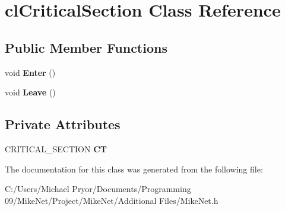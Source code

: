 \hypertarget{classcl_critical_section}{
\section{clCriticalSection Class Reference}
\label{classcl_critical_section}
}
\subsection*{Public Member Functions}
\begin{DoxyCompactItemize}
\item 
\hypertarget{classcl_critical_section_acbd3a5ab62736a9b18296fb2108b795e}{
void {\bfseries Enter} ()}
\label{classcl_critical_section_acbd3a5ab62736a9b18296fb2108b795e}

\item 
\hypertarget{classcl_critical_section_a374394a81324cc36bb8817b5feb45c6b}{
void {\bfseries Leave} ()}
\label{classcl_critical_section_a374394a81324cc36bb8817b5feb45c6b}

\end{DoxyCompactItemize}
\subsection*{Private Attributes}
\begin{DoxyCompactItemize}
\item 
\hypertarget{classcl_critical_section_a4d3de64b3b0ddc87a494fe8b4e60b196}{
CRITICAL\_\-SECTION {\bfseries CT}}
\label{classcl_critical_section_a4d3de64b3b0ddc87a494fe8b4e60b196}

\end{DoxyCompactItemize}


The documentation for this class was generated from the following file:\begin{DoxyCompactItemize}
\item 
C:/Users/Michael Pryor/Documents/Programming 09/MikeNet/Project/MikeNet/Additional Files/MikeNet.h\end{DoxyCompactItemize}
